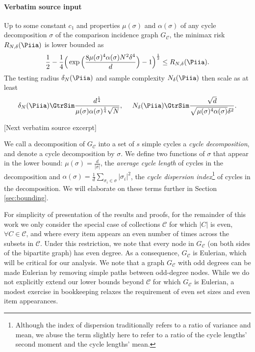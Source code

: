\documentclass[10pt]{article}
\begin{document}
\paragraph{Verbatim source input}
\begin{ReviewVerbatim}
\begin{theorem}\label{thm:lower_bound}
		Up to some constant $c_1$ and properties $\mu(\sigma)$ and $\alpha(\sigma)$ of any cycle decomposition $\sigma$ of the comparison incidence graph $G_\mathcal{C}$, the minimax risk $R_{N,\delta}(\Piia)$ is lower bounded as
		$$
		\frac{1}{2} -
		\frac{1}{4}
		\Big(\exp\Big(
		\frac{8\mu(\sigma)^4\alpha(\sigma)N^2 \delta^4}{d}\Big) -1
		\Big)^{\frac{1}{2}}
		\leq R_{N,\delta}(\Piia).
		$$
		The testing radius $\delta_N(\Piia)$ and sample complexity $N_\delta(\Piia)$ then scale as at least
		$$
		\delta_N(\Piia) \GtrSim \frac{d^{\frac{1}{4}}}{\mu(\sigma)\alpha(\sigma)^{\frac{1}{4}}\sqrt{N}}, \ \ \ \
		N_\delta(\Piia) \GtrSim \frac{\sqrt{d}}{\sqrt{\mu(\sigma)^4\alpha(\sigma)}\delta^2}.$$
		\end{theorem}

[Next verbatim source excerpt]

	We call a decomposition of $G_\mathcal{C}$ into a set of $s$ simple cycles a {\it cycle decomposition}, and denote a cycle decomposition by $\sigma$. We define two functions of $\sigma$ that appear in the lower bound: $\mu(\sigma) = \frac{d}{|\sigma|}$, the \textit{average cycle length} of cycles in the decomposition and $\alpha(\sigma) = \frac{1}{d}\sum_{\sigma_i \in \sigma} |\sigma_i|^2$, the \textit{cycle dispersion index}\footnote{Although the index of dispersion traditionally refers to a ratio of variance and mean, we abuse the term slightly here to refer to a ratio of the cycle lengths' second moment and the cycle lengths' mean.} of cycles in the decomposition. We will elaborate on these terms further in Section \ref{sec:bounding}.

	For simplicity of presentation of the results and proofs, for the remainder of this work we only consider the special case of collections $\mathcal{C}$ for which $|C|$ is even, $\forall C \in \mathcal{C}$, and where every item appears an even number of times across the subsets in $\mathcal{C}$. Under this restriction, we note that every node in $G_\mathcal{C}$ (on both sides of the bipartite graph) has even degree. As a consequence, $G_\mathcal{C}$ is Eulerian, which will be critical for our analysis.
	We note that a graph $G_\mathcal{C}$ with odd degrees can be made Eulerian by removing simple paths between odd-degree nodes. While we do not explicitly extend our lower bounds beyond $\mathcal C$ for which $G_\mathcal{C}$ is Eulerian, a modest exercise in bookkeeping relaxes the requirement of even set sizes and even item appearances.


\end{ReviewVerbatim}
\end{document}
